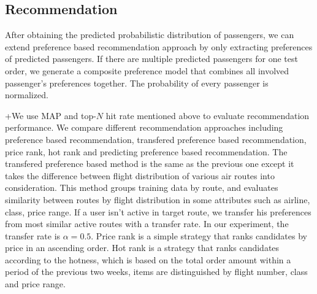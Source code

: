 \documentclass{llncs}
\begin{document}
\subsection{Recommendation}
After obtaining the predicted probabilistic distribution of passengers, we can extend preference based recommendation approach by only extracting preferences of predicted passengers. If there are multiple predicted passengers for one test order, we generate a composite preference model that combines all involved passenger's preferences together. The probability of every passenger is normalized.\par
 +We use MAP and top-$N$ hit rate mentioned above to evaluate recommendation performance. We compare different recommendation approaches including preference based recommendation, transfered preference based recommendation, price rank, hot rank and predicting preference based recommendation. The transfered preference based method is the same as the previous one except it takes the difference between flight distribution of various air routes into consideration. This method groups training data by route, and evaluates similarity between routes by flight distribution in some attributes such as airline, class, price range. If a user isn't active in target route, we transfer his preferences from most similar active routes with a transfer rate. In our experiment, the transfer rate is  $ \alpha = 0.5$. Price rank is a simple strategy that ranks candidates by price in an ascending order. Hot rank is a strategy that ranks candidates according to the hotness, which is based on the total order amount within a period of the previous two weeks, items are distinguished by flight number, class and price range.\par
\end{document}
